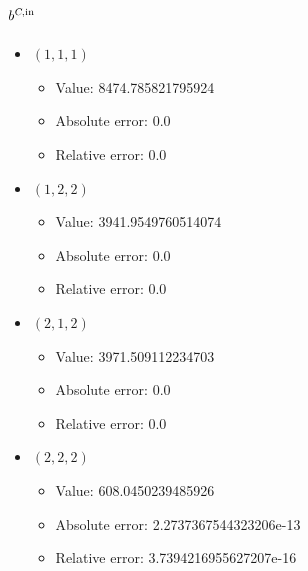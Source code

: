 \documentclass{article}%
\begin{document}
\subsection{$b^{\textsl{C},\text{in}}$}%
\begin{itemize}%
	\item $(1, 1, 1)$%
	\begin{itemize}%
		\item Value: 8474.785821795924%
		\item Absolute error: 0.0%
		\item Relative error: 0.0%
	\end{itemize}%
	\item $(1, 2, 2)$%
	\begin{itemize}%
		\item Value: 3941.9549760514074%
		\item Absolute error: 0.0%
		\item Relative error: 0.0%
	\end{itemize}%
	\item $(2, 1, 2)$%
	\begin{itemize}%
		\item Value: 3971.509112234703%
		\item Absolute error: 0.0%
		\item Relative error: 0.0%
	\end{itemize}%
	\item $(2, 2, 2)$%
	\begin{itemize}%
		\item Value: 608.0450239485926%
		\item Absolute error: 2.2737367544323206e-13%
		\item Relative error: 3.7394216955627207e-16%
	\end{itemize}%
\end{itemize}%
\end{document}
